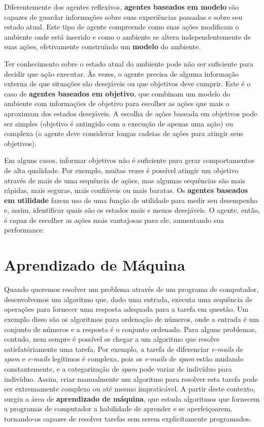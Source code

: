 Diferentemente dos agentes reflexivos, \textbf{agentes baseados em modelo} são
capazes de guardar informações sobre suas experiências passadas e sobre seu
estado atual. Este tipo de agente compreende como suas ações modificam o
ambiente onde está inserido e como o ambiente se altera independentemente de
suas ações, efetivamente construíndo um \textbf{modelo} do ambiente. 

Ter conhecimento sobre o estado atual do ambiente pode não ser suficiente para
decidir que ação executar. Às vezes, o agente precisa de alguma informação
externa de que situações são desejáveis ou que objetivos deve cumprir. Este é o
caso de \textbf{agentes baseados em objetivo}, que combinam um modelo do
ambiente com informações de objetivo para escolher as ações que mais o aproximam
dos estados desejáveis. A escolha de ações baseada em objetivos pode ser simples
(objetivo é antingido com a execução de apenas uma ação) ou complexa (o agente
deve considerar longas cadeias de ações para atingir seus objetivos).

Em alguns casos, informar objetivos não é suficiente para gerar comportamentos
de alta qualidade. Por exemplo, muitas vezes é possível atingir um objetivo
através de mais de uma sequência de ações, mas algumas sequências são mais
rápidas, mais seguras, mais confiáveis ou mais baratas. Os \textbf{agentes
baseados em utilidade} fazem uso de uma função de utilidade para medir seu
desempenho e, assim, identificar quais são os estados mais e menos desejáveis. O
agente, então, é capaz de escolher as ações mais vantajosas para ele, aumentando
sua performance.


\section{\label{section:machine-learning}Aprendizado de Máquina}
Quando queremos resolver um problema através de um programa de computador,
desenvolvemos um algoritmo que, dado uma entrada, executa uma sequência de
operações para fornecer uma resposta adequada para a tarefa em questão. Um
exemplo disso são os algoritmos para ordenação de números, onde a entrada é
um conjunto de números e a resposta é o conjunto ordenado. Para alguns
problemas, contudo, nem sempre é possível se chegar a um algoritmo que resolve
satisfatóriamente uma tarefa. Por exemplo, a tarefa de diferenciar
\textit{e-mails} de \textit{spam} e \textit{e-mails} legítimos é complexa, pois
os \textit{e-mails} de \textit{spam} estão mudando constantemente, e a
categorização de \textit{spam} pode variar de indivíduo para indivíduo. Assim,
criar manualmente um algoritmo para resolver esta tarefa pode ser extremamente
complexo ou até mesmo impraticável. A partir deste contexto, surgiu a área de
\textbf{aprendizado de máquina}, que estuda algoritmos que fornecem a programas
de computador a habilidade de aprender e se aperfeiçoarem, tornando-os capazes
de resolver tarefas sem serem explicitamente programados.

